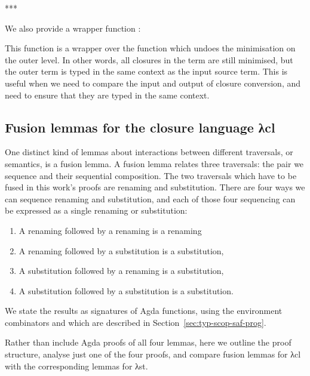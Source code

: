 \documentclass[bsc,frontabs,oneside,singlespacing,parskip,deptreport]{infthesis}
\theoremstyle{definition}
\theoremstyle{lemma}
\begin{document}
***

We also provide a wrapper function :


This function is a wrapper over the  function which undoes
the minimisation on the outer level. In other words, all closures in
the term are still minimised, but the outer term is typed in the same
context as the input source term. This is useful when we need to
compare the input and output of closure conversion, and need to ensure
that they are typed in the same context.

\subsection{Fusion lemmas for the closure language λcl}

One distinct kind of lemmas about interactions between different
traversals, or semantics, is a fusion lemma.  A fusion lemma relates
three traversals: the pair we sequence and their sequential
composition. The two traversals which have to be fused in this work's
proofs are renaming and substitution. There are four ways we can
sequence renaming and substitution, and each of those four sequencing
can be expressed as a single renaming or substitution:

\begin{enumerate}[nolistsep]
  \item A renaming followed by a renaming is a renaming
  \item A renaming followed by a substitution is a substitution,
  \item A substitution followed by a renaming is a substitution,
  \item A substitution followed by a substitution is a substitution.
\end{enumerate}

We state the results as signatures of Agda functions, using the
environment combinators \AS{\_<\$>\_} and  which are described
in Section~\ref{sec:typ-scop-saf-prog}.


Rather than include Agda proofs of all four lemmas, here we outline
the proof structure, analyse just one of the four proofs, and compare
fusion lemmas for λcl with the corresponding lemmas for λst.
\end{document}
